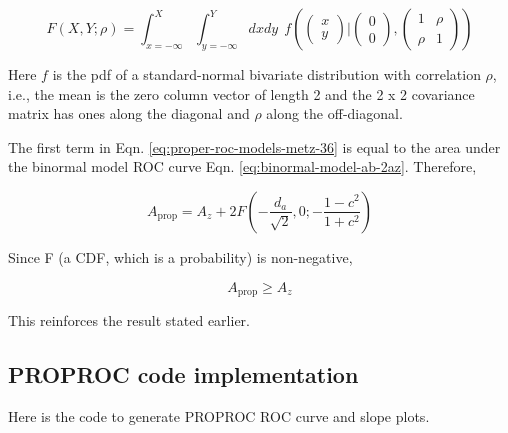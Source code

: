 \documentclass[
]{book}
\begin{document}
\begin{equation} 
F\left( X,Y;\rho \right)=\int_{x=-\infty}^{X}
\int_{y=-\infty}^{Y}
dx dy ~ ~  f\left( 
\left( \begin{matrix}
x \\
y
\end{matrix}
 \right) \bigg\rvert
\left( \begin{matrix}
0 \\
0
\end{matrix}  \right),
\left( \begin{matrix}
1 & \rho \\
\rho & 1
\end{matrix} \right)
\right)
\label{eq:proper-roc-models-def-bivariate-cdf}
\end{equation}

Here \(f\) is the pdf of a standard-normal bivariate distribution with correlation \(\rho\), i.e., the mean is the zero column vector of length 2 and the 2 x 2 covariance matrix has ones along the diagonal and \(\rho\) along the off-diagonal.

The first term in Eqn. \eqref{eq:proper-roc-models-metz-36} is equal to the area under the binormal model ROC curve Eqn. \eqref{eq:binormal-model-ab-2az}. Therefore,

\begin{equation} 
A_{\text{prop}}=A_z+2F\left( -\frac{d_a}{\sqrt{2}},0;-\frac{1-c^2}{1+c^2} \right)
\label{eq:proper-roc-models-area-proproc2}
\end{equation}

Since F (a CDF, which is a probability) is non-negative,

\begin{equation} 
A_{\text{prop}}\ge A_z
\label{eq:proper-roc-models-area-proproc-az-inequality}
\end{equation}

This reinforces the result stated earlier.

\hypertarget{proper-roc-models-proproc-code}{%
\subsection{PROPROC code implementation}\label{proper-roc-models-proproc-code}}

Here is the code to generate PROPROC ROC curve and slope plots.
\end{document}
